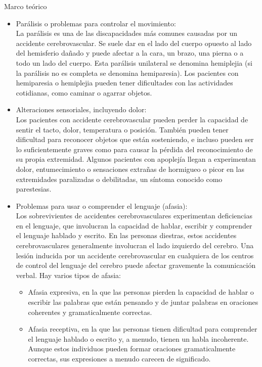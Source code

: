 \begin{thesischapter}{1} {Marco teórico}
    \begin{itemize}
        \item Parálisis o problemas para controlar el movimiento: \\
        La parálisis es una de las discapacidades más comunes causadas por un accidente
        cerebrovascular. Se suele dar en el lado del cuerpo opuesto al lado del hemisferio   dañado y
        puede afectar a la cara, un brazo, una pierna o a todo un lado del cuerpo. Esta parálisis
        unilateral se denomina hemiplejia (si la parálisis no es completa se denomina
        hemiparesia). Los pacientes con hemiparesia o hemiplejia pueden tener dificultades con
        las actividades cotidianas, como caminar o agarrar objetos.~\cite{cuidadosalpacienteadulto}
        \item Alteraciones sensoriales, incluyendo dolor:\\
        Los pacientes con accidente cerebrovascular pueden perder la capacidad de sentir
        el tacto, dolor, temperatura o posición. También pueden tener dificultad para reconocer
        objetos que están sosteniendo, e incluso pueden ser lo suficientemente graves como para
        causar la pérdida del reconocimiento de su propia extremidad. Algunos pacientes con
        apoplejía llegan a experimentan dolor, entumecimiento o sensaciones extrañas de
        hormigueo o picor en las extremidades paralizadas o debilitadas, un síntoma conocido
        como parestesias.~\cite{post-strok}
        \item Problemas para usar o comprender el lenguaje (afasia):\\
        Los sobrevivientes de accidentes cerebrovasculares experimentan deficiencias en el lenguaje, 
        que involucran la capacidad de hablar, escribir y comprender el lenguaje hablado y escrito. 
        En las personas diestras, estos accidentes cerebrovasculares generalmente involucran el lado 
        izquierdo del cerebro. Una lesión inducida por un accidente cerebrovascular en cualquiera de 
        los centros de control del lenguaje del cerebro puede afectar gravemente la comunicación verbal. 
        Hay varios tipos de afasia:~\cite{post-strok}
        \begin{itemize}
            \item Afasia expresiva, en la que las personas pierden la capacidad de hablar o escribir las palabras que están pensando y de juntar palabras en oraciones coherentes y gramaticalmente correctas.
            \item Afasia receptiva, en la que las personas tienen dificultad para comprender el lenguaje hablado o escrito y, a menudo, tienen un habla incoherente. Aunque estos individuos pueden formar oraciones gramaticalmente correctas, sus expresiones a menudo carecen de significado.

\end{itemize}
\end{itemize}
\end{thesischapter}
